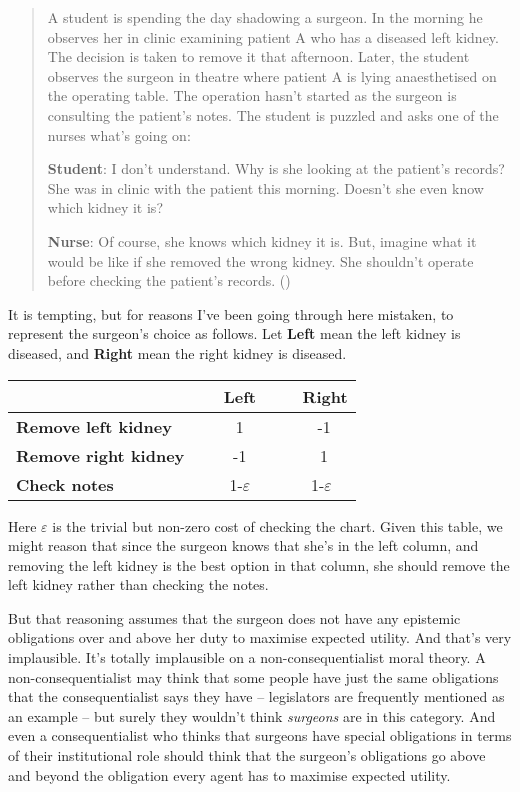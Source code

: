 \documentclass[
  10pt,
  letterpaper,
  DIV=11,
  numbers=noendperiod,
  twoside]{scrartcl}
\begin{document}
\begin{quote}
A student is spending the day shadowing a surgeon. In the morning he
observes her in clinic examining patient A who has a diseased left
kidney. The decision is taken to remove it that afternoon. Later, the
student observes the surgeon in theatre where patient A is lying
anaesthetised on the operating table. The operation hasn't started as
the surgeon is consulting the patient's notes. The student is puzzled
and asks one of the nurses what's going on:

\textbf{Student}: I don't understand. Why is she looking at the
patient's records? She was in clinic with the patient this morning.
Doesn't she even know which kidney it is?

\textbf{Nurse}: Of course, she knows which kidney it is. But, imagine
what it would be like if she removed the wrong kidney. She shouldn't
operate before checking the patient's records.
()
\end{quote}

It is tempting, but for reasons I've been going through here mistaken,
to represent the surgeon's choice as follows. Let \textbf{Left} mean the
left kidney is diseased, and \textbf{Right} mean the right kidney is
diseased.

\begin{longtable}[]{@{}lcc@{}}
\toprule\noalign{}
~ & ~ \textbf{Left} ~ & ~ \textbf{Right} \\
\midrule\noalign{}
\endhead
\bottomrule\noalign{}
\endlastfoot
\textbf{Remove left kidney} ~ & ~ 1 ~ & ~ -1 \\
\textbf{Remove right kidney}~ & ~ -1 ~ & ~ 1 \\
\textbf{Check notes} ~ & ~1-\(\varepsilon\)~ & ~1-\(\varepsilon\) \\
\end{longtable}

Here \(\varepsilon\) is the trivial but non-zero cost of checking the
chart. Given this table, we might reason that since the surgeon knows
that she's in the left column, and removing the left kidney is the best
option in that column, she should remove the left kidney rather than
checking the notes.

But that reasoning assumes that the surgeon does not have any epistemic
obligations over and above her duty to maximise expected utility. And
that's very implausible. It's totally implausible on a
non-consequentialist moral theory. A non-consequentialist may think that
some people have just the same obligations that the consequentialist
says they have -- legislators are frequently mentioned as an example --
but surely they wouldn't think \emph{surgeons} are in this category. And
even a consequentialist who thinks that surgeons have special
obligations in terms of their institutional role should think that the
surgeon's obligations go above and beyond the obligation every agent has
to maximise expected utility.
\end{document}
